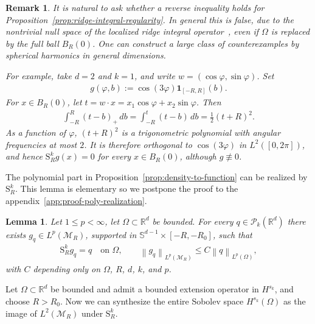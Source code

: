 \documentclass[12pt]{article}
\numberwithin{equation}{section}
\newtheorem{remark}{Remark}
\newtheorem{lemma}{Lemma}[section]
\numberwithin{figure}{section}
\numberwithin{equation}{section}
\newcommand{\R}{\mathbb{R}}
\newcommand{\Sph}{\mathbb S}
\newcommand{\MR}{\mathcal M_R}
\newcommand{\norm}[1]{\left\|#1\right\|}
\begin{document}
\begin{remark}
    It is natural to ask whether a reverse inequality holds for
    Proposition~\ref{prop:ridge-integral-regularity}. In general this is false, due to
    the nontrivial null space of the localized ridge integral
    operator~\cite{unser_RidgesNeuralNetworks_2023,ludwig_radontransformeuclidean_1966}, even if
    $\Omega$ is replaced by the full ball $B_R(0)$. One can construct
    a large class of counterexamples by spherical harmonics in general dimensions.

    For example, take $d=2$ and $k=1$, and write
    $w=(\cos\varphi,\sin\varphi)$. Set
    \begin{align*}
        g(\varphi,b):=\cos(3\varphi)\mathbf 1_{[-R,R]}(b).
    \end{align*}
    For $x\in B_R(0)$, let
    $t=w\cdot x=x_1\cos\varphi+x_2\sin\varphi$. Then
    \begin{align*}
        \int_{-R}^R (t-b)_+\,db
        =\int_{-R}^t(t-b)\,db
        =\frac12(t+R)^2 .
    \end{align*}
    As a function of $\varphi$, $(t+R)^2$ is a trigonometric polynomial with
    angular frequencies at most $2$. It is therefore orthogonal to
    $\cos(3\varphi)$ in $L^2([0,2\pi])$, and hence
    $\mathrm{S}^k_R g(x)=0$ for every $x\in B_R(0)$, although
    $g\not\equiv0$.
\end{remark}

The polynomial part in Proposition~\ref{prop:density-to-function} can be
realized by $\mathrm{S}^k_R$. This lemma is elementary so we postpone the proof
to the appendix~\ref{app:proof-poly-realization}.

\begin{lemma}
\label{lem:polynomial-lp-density}
Let $1\le p<\infty$, let $\Omega\subset\R^d$ be bounded.
  For every $q\in\mathcal P_k(\R^d)$ there
exists $g_q\in L^p(\MR)$, supported in $\Sph^{d-1}\times[-R,-R_0]$, such that
\begin{align*}
    \mathrm{S}^k_R g_q=q\quad\text{on }\Omega,
    \qquad
    \norm{g_q}_{L^p(\MR)}\le C\norm{q}_{L^p(\Omega)},
\end{align*}
with $C$ depending only on $\Omega$, $R$, $d$, $k$, and $p$.
\end{lemma}



Let $\Omega\subset\R^d$ be bounded and admit a bounded extension operator in
$H^{s_k}$, and choose $R>R_0$. Now we can synthesize
the entire Sobolev space $H^{s_k}(\Omega)$ as the image of $L^2(\MR)$ under $\mathrm{S}^k_R$.
\end{document}
